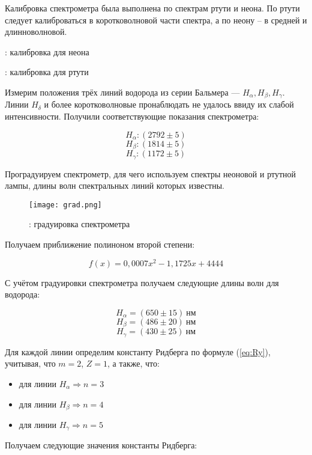 Калибровка спектрометра была выполнена по спектрам ртути и неона. По ртути
следует калиброваться в коротковолновой части спектра, а по неону -- в средней и
длинноволновой.

\begin{table}[h!]
  \centering
  
  \caption{: калибровка для неона}
  \label{tb1}
\end{table}

\begin{table}[h!]
  \centering
  
  \caption{: калибровка для ртути}
  \label{tb2}
\end{table}

Измерим положения трёх линий водорода из серии Бальмера --- $H_{\alpha},
  H_{\beta}, H_{\gamma}$. Линии $H_{\delta}$ и более коротковолновые
пронаблюдать не удалось ввиду их слабой интенсивности.  Получили
соответствующие показания спектрометра:

\[  H_{\alpha}: (2792\pm 5) \]
\[  H_{\beta} : (1814 \pm 5) \]
\[ H_{\gamma} : (1172 \pm 5) \]

Проградуируем спектрометр, для чего используем спектры неоновой и ртутной
лампы, длины волн спектральных линий которых известны.

\begin{figure}[h!]
  \centering
  \texttt{[image: grad.png]}
  \caption{ : градуировка спектрометра}
  \label{al}
\end{figure}

Получаем приближение полиноном второй степени:

\[ f(x) = 0,0007x^{2} -1,1725x + 4444 \]


С учётом градуировки спектрометра получаем следующие длины волн для
водорода:


\[  H_{\alpha} = (650\pm 15)\ \text{нм} \]
\[  H_{\beta} = (486\pm 20)\ \text{нм} \]
\[  H_{\gamma} = (430\pm  25)\  \text{нм} \]


Для каждой линии определим константу Ридберга по формуле (\ref{eq:Ry}),
учитывая, что $m=2$, $Z=1$, а также, что:

\newpage

\begin{itemize}
  \item для линии $H_{\alpha} \Rightarrow n=3$
  \item для линии $H_{\beta}  \Rightarrow n=4$
  \item для линии $H_{\gamma} \Rightarrow n=5$
\end{itemize}
Получаем следующие значения константы Ридберга:

